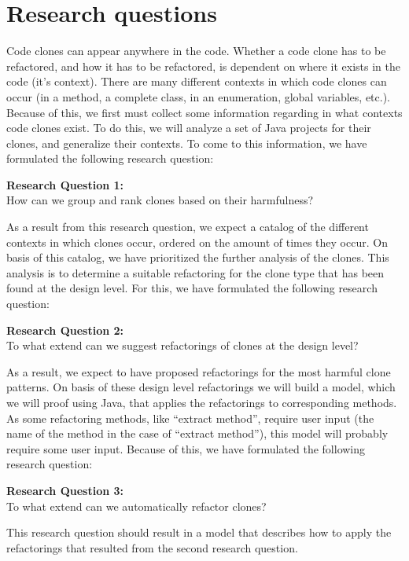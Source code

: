 \documentclass{report}
\theoremstyle{definition}
\theoremstyle{remark}
\begin{document}
\section{Research questions}
Code clones can appear anywhere in the code. Whether a code clone has to be refactored, and how it has to be refactored, is dependent on where it exists in the code (it's context). There are many different contexts in which code clones can occur (in a method, a complete class, in an enumeration, global variables, etc.). Because of this, we first must collect some information regarding in what contexts code clones exist. To do this, we will analyze a set of Java projects for their clones, and generalize their contexts. To come to this information, we have formulated the following research question:
\begin{displayquote}
\textbf{Research Question 1:}\\How can we group and rank clones based on their harmfulness?
\end{displayquote}
As a result from this research question, we expect a catalog of the different contexts in which clones occur, ordered on the amount of times they occur. On basis of this catalog, we have prioritized the further analysis of the clones. This analysis is to determine a suitable refactoring for the clone type that has been found at the design level. For this, we have formulated the following research question:
\begin{displayquote}
\textbf{Research Question 2:}\\To what extend can we suggest refactorings of clones at the design level?
\end{displayquote}
As a result, we expect to have proposed refactorings for the most harmful clone patterns. On basis of these design level refactorings we will build a model, which we will proof using Java, that applies the refactorings to corresponding methods. As some refactoring methods, like ``extract method'', require user input (the name of the method in the case of ``extract method''), this model will probably require some user input. Because of this, we have formulated the following research question:
\begin{displayquote}
\textbf{Research Question 3:}\\To what extend can we automatically refactor clones?
\end{displayquote}
This research question should result in a model that describes how to apply the refactorings that resulted from the second research question.



\newpage


\end{document}
